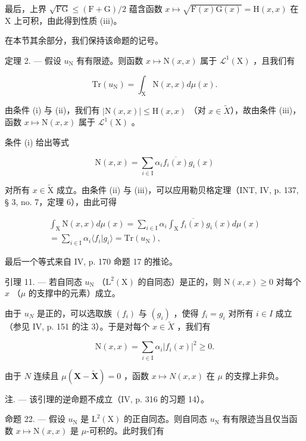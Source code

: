 最后，上界 \(\sqrt{\mathrm{FG}} \leqslant (\mathrm{F} + \mathrm{G}) / 2\) 蕴含函数 \(x \mapsto \sqrt{\mathrm{F}(x)\mathrm{G}(x)} = \mathrm{H}(x,x)\) 在 X 上可积，由此得到性质 (iii)。

在本节其余部分，我们保持该命题的记号。

定理 2. --- 假设 \(u_{\mathrm{N}}\) 有有限迹。则函数 \(x \mapsto \mathrm{N}(x, x)\) 属于 \(\mathcal{L}^1(\mathrm{X})\) ，且我们有

\[
\mathrm{Tr} (u _ {\mathrm{N}}) = \int_ {\mathrm{X}} \mathrm{N} (x, x) d \mu (x).
\]

由条件 (i) 与 (ii)，我们有 \(|\mathrm{N}(x,x)| \leqslant \mathrm{H}(x,x)\) （对 \(x \in \widetilde{X}\)），故由条件 (iii)，函数 \(x \mapsto \mathrm{N}(x,x)\) 属于 \(\mathcal{L}^{1}(\mathrm{X})\) 。

条件 (i) 给出等式

\[
\mathrm{N} (x, x) = \sum_ {i \in \mathrm{I}} \alpha_ {i} \overline {{f _ {i} (x)}} g _ {i} (x)
\]

对所有 \(x \in \widetilde{\mathrm{X}}\) 成立。由条件 (ii) 与 (iii)，可以应用勒贝格定理（INT, IV, p. 137, § 3, no. 7，定理 6），由此可得

\[
\begin{array}{r} \int_ {\mathrm{X}} \mathrm{N} (x, x) d \mu (x) = \sum_ {i \in \mathrm{I}} \alpha_ {i} \int_ {\mathrm{X}} \overline {{f _ {i} (x)}} g _ {i} (x) d \mu (x) \\ = \sum_ {i \in \mathrm{I}} \alpha_ {i} \langle f _ {i} | g _ {i} \rangle = \mathrm{Tr} (u _ {\mathrm{N}}), \end{array}
\]

最后一个等式来自 IV, p. 170 命题 17 的推论。

引理 11. --- 若自同态 \(u_{\mathrm{N}}\) （\(\mathrm{L}^2(\mathrm{X})\) 的自同态）是正的，则 \(\mathrm{N}(x,x) \geqslant 0\) 对每个 \(x\) （\(\mu\) 的支撑中的元素）成立。

由于 \(u_{N}\) 是正的，可以选取族 \((f_{i})\) 与 \((g_{i})\) ，使得 \(f_{i} = g_{i}\) 对所有 \(i \in I\) 成立（参见 IV, p. 151 的注 3）。于是对每个 \(x \in \widetilde{X}\) ，我们有

\[
\mathrm{N} (x, x) = \sum_ {i \in \mathrm{I}} \alpha_ {i} | f _ {i} (x) | ^ {2} \geqslant 0.
\]

由于 \(N\) 连续且 \(\mu(\mathbf{X}-\widetilde{\mathbf{X}})=0\) ，函数 \(x \mapsto N(x,x)\) 在 \(\mu\) 的支撑上非负。

注. --- 该引理的逆命题不成立（IV, p. 316 的习题 14）。

命题 22. --- 假设 \(u_{\mathrm{N}}\) 是 \(\mathrm{L}^2(\mathrm{X})\) 的正自同态。则自同态 \(u_{\mathrm{N}}\) 有有限迹当且仅当函数 \(x \mapsto \mathrm{N}(x,x)\) 是 \(\mu\)-可积的。此时我们有


